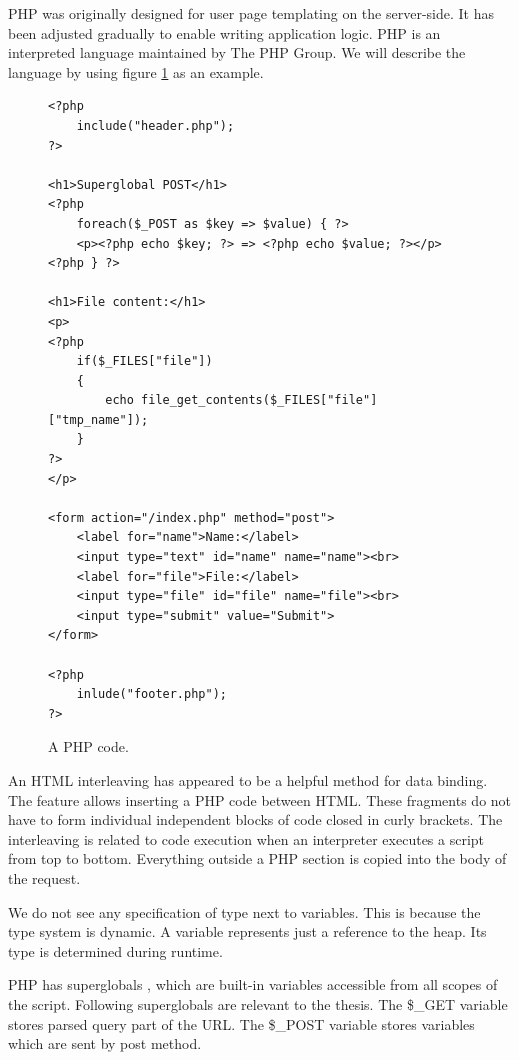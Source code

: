 PHP  was originally designed for user page templating on the server-side.
It has been adjusted gradually to enable writing application logic.
PHP is an interpreted language maintained by The PHP Group.
We will describe the language by using figure \ref{img01:php} as an example.
\par
\begin{figure}[H]
\begin{lstlisting}
<?php
    include("header.php");
?>

<h1>Superglobal POST</h1>
<?php
    foreach($_POST as $key => $value) { ?>
    <p><?php echo $key; ?> => <?php echo $value; ?></p>
<?php } ?>

<h1>File content:</h1>
<p>
<?php 
    if($_FILES["file"])
    {
        echo file_get_contents($_FILES["file"]["tmp_name"]);
    }	
?>
</p>

<form action="/index.php" method="post">
    <label for="name">Name:</label>
    <input type="text" id="name" name="name"><br>
    <label for="file">File:</label>
    <input type="file" id="file" name="file"><br>
    <input type="submit" value="Submit">
</form>

<?php
    inlude("footer.php");
?>
\end{lstlisting}
\caption{A PHP code.}
\label{img01:php}
\end{figure}
\par
{}
An HTML interleaving has appeared to be a helpful method for data binding.
The feature allows inserting a PHP code between HTML.
These fragments do not have to form individual independent blocks of code closed in curly brackets.
The interleaving is related to code execution when an interpreter executes a script from top to bottom. Everything outside a PHP section is copied into the body of the request.
\par
We do not see any specification of type next to variables.
This is because the type system is dynamic.
A variable represents just a reference to the heap.
Its type is determined during runtime. 
\par
PHP has superglobals , which are built-in variables accessible from all scopes of the script.
Following superglobals are relevant to the thesis.
The \$\_GET variable stores parsed query part of the URL.
The \$\_POST variable stores variables which are sent by post method.
